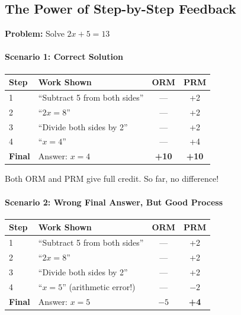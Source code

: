 \begin{chapterenv}
\section{The Power of Step-by-Step Feedback}

\textbf{Problem:} Solve $2x + 5 = 13$

\paragraph{Scenario 1: Correct Solution}

\begin{center}
\begin{tabular}{lp{4cm}cc}
\toprule
\textbf{Step} & \textbf{Work Shown} & \textbf{ORM} & \textbf{PRM} \\
\midrule
1 & ``Subtract 5 from both sides'' & --- & +2 \\
2 & ``$2x = 8$'' & --- & +2 \\
3 & ``Divide both sides by 2'' & --- & +2 \\
4 & ``$x = 4$'' & --- & +4 \\
\midrule
\textbf{Final} & Answer: $x = 4$ & \textbf{+10} & \textbf{+10} \\
\bottomrule
\end{tabular}
\end{center}

Both ORM and PRM give full credit. So far, no difference!

\paragraph{Scenario 2: Wrong Final Answer, But Good Process}

\begin{center}
\begin{tabular}{lp{4cm}cc}
\toprule
\textbf{Step} & \textbf{Work Shown} & \textbf{ORM} & \textbf{PRM} \\
\midrule
1 & ``Subtract 5 from both sides'' & --- & +2 \\
2 & ``$2x = 8$'' & --- & +2 \\
3 & ``Divide both sides by 2'' & --- & +2 \\
4 & ``$x = 5$'' (arithmetic error!) & --- & $-2$ \\
\midrule
\textbf{Final} & Answer: $x = 5$ & \textbf{$-5$} & \textbf{+4} \\
\bottomrule
\end{tabular}
\end{center}


\end{chapterenv}

